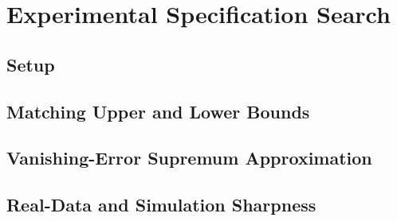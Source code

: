 \section{Experimental Specification Search}
\label{sec:experimental-case}

%

\subsection{Setup}
\label{sec:setup}


\subsection{Matching Upper and Lower Bounds}
\label{sec:sparse-search}


\subsection{Vanishing-Error Supremum Approximation}


\subsection{Real-Data and Simulation Sharpness}

